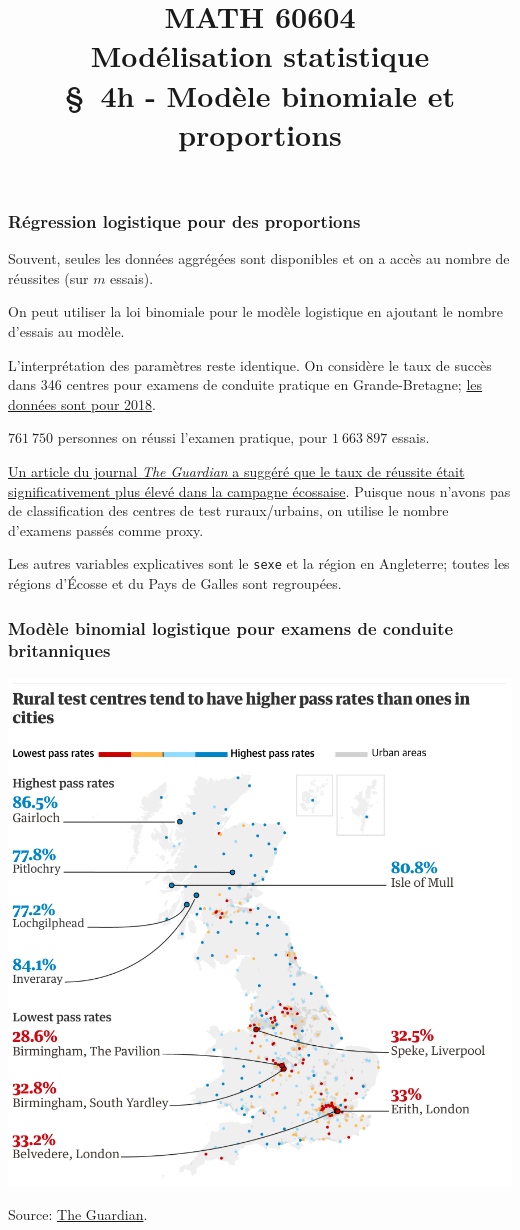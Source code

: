 \documentclass{beamer}
\title[\color{white}{MATH 60604 \S~4h - Modèle binomiale et proportions}]{\texorpdfstring{MATH 60604 \\Modélisation statistique \\ \S~4h - Modèle binomiale et proportions}{MATH 60604 \\Modélisation statistique \\ \S~4h - Modèle binomiale et proportions}}
\author{}
\institute{HEC Montréal\\
Département de sciences de la décision}
\date{}
\begin{document}
\frame{\titlepage}

\begin{frame}
 \frametitle{Régression logistique pour des proportions}
 
 \bi \item Souvent, seules les données aggrégées sont disponibles et on a accès au nombre de réussites (sur $m$ essais).
 \item On peut utiliser la loi binomiale pour le modèle logistique en ajoutant le nombre d'essais au modèle.
 \item L'interprétation des paramètres reste identique.
 \ei 
 On considère le taux de succès dans 346 centres pour examens de conduite pratique en Grande-Bretagne; \href{https://www.gov.uk/government/statistical-data-sets/driving-test-statistics-drt}{les données sont pour 2018}.

\bi 
\item $761\ 750$ personnes on réussi l'examen pratique, pour $1\ 663\ 897$ essais.
\item \href{https://www.theguardian.com/world/2019/aug/23/an-easy-ride-scottish-village-fuels-debate-driving-test-pass-rates}{Un article du journal \textit{The Guardian} a suggéré que le taux de réussite était significativement plus élevé dans la campagne écossaise}. Puisque nous n'avons pas de classification des centres de test ruraux/urbains, on utilise le nombre d'examens passés comme proxy.
\item Les autres variables explicatives sont le \texttt{sexe} et la région en Angleterre; toutes les régions d'Écosse et du Pays de Galles sont regroupées.
\ei
 \end{frame}
 \begin{frame}
 \frametitle{Modèle binomial logistique pour examens de conduite britanniques}
 \begin{center}
  \includegraphics[width = 0.6\linewidth]{img/c4/01-intro-Guardian_UK_driving2.png}
 \end{center}
 {\footnotesize 
Source: \href{https://www.theguardian.com/world/2019/aug/23/an-easy-ride-scottish-village-fuels-debate-driving-test-pass-rates}{The Guardian}.}
\end{frame}
\end{document}
